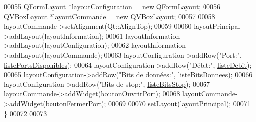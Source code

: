 \begin{DoxyCode}
00055     QFormLayout *layoutConfiguration = \textcolor{keyword}{new} QFormLayout;
00056     QVBoxLayout *layoutCommande = \textcolor{keyword}{new} QVBoxLayout;
00057 
00058     layoutCommande->setAlignment(Qt::AlignTop);
00059 
00060     layoutPrincipal->addLayout(layoutInformation);
00061     layoutInformation->addLayout(layoutConfiguration);
00062     layoutInformation->addLayout(layoutCommande);
00063     layoutConfiguration->addRow(\textcolor{stringliteral}{"Port:"}, \hyperlink{class_i_h_m_configuration_af3ce74444e24237aedf1d2ef2053b574}{listePortsDisponibles});
00064     layoutConfiguration->addRow(\textcolor{stringliteral}{"Débit:"}, \hyperlink{class_i_h_m_configuration_a98e8133a04509b3a80b232d2f031e81f}{listeDebit});
00065     layoutConfiguration->addRow(\textcolor{stringliteral}{"Bits de données:"}, \hyperlink{class_i_h_m_configuration_a83c61d075d53758bd753aada9a0bb452}{listeBitsDonnees});
00066     layoutConfiguration->addRow(\textcolor{stringliteral}{"Bits de stop:"}, \hyperlink{class_i_h_m_configuration_a16ae724388b797983c78e87e7d5485cb}{listeBitsStop});
00067     layoutCommande->addWidget(\hyperlink{class_i_h_m_configuration_a824b7f6c0d332b8f6f76801e545b14ad}{boutonOuvrirPort});
00068     layoutCommande->addWidget(\hyperlink{class_i_h_m_configuration_a25c0b3c51a8d162ae3439a56ec644909}{boutonFermerPort});
00069 
00070     setLayout(layoutPrincipal);
00071 \}
00072 
00073 
\end{DoxyCode}
